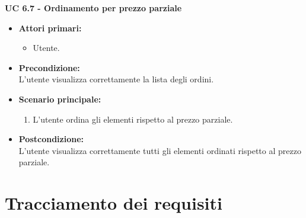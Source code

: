 \vspace{0.5cm}

\noindent \textbf{\large UC 6.7 - Ordinamento per prezzo parziale}
\label{uc:ordinamento-prezzo-parziale-ord}
\begin{itemize}

	\item \textbf{Attori primari: }
		\begin{itemize}
			\item Utente.
		\end{itemize}

	\item \textbf{Precondizione: }\\[0.3cm]
		L'utente visualizza correttamente la lista degli ordini.

	\item \textbf{Scenario principale: }
		\begin{enumerate}
			\item L'utente ordina gli elementi rispetto al prezzo parziale.
		\end{enumerate}
		

	\item \textbf{Postcondizione: }\\[0.3cm]
		L'utente visualizza correttamente tutti gli elementi ordinati rispetto al prezzo parziale.

\end{itemize}

\vspace{0.5cm}

\section{Tracciamento dei requisiti}

